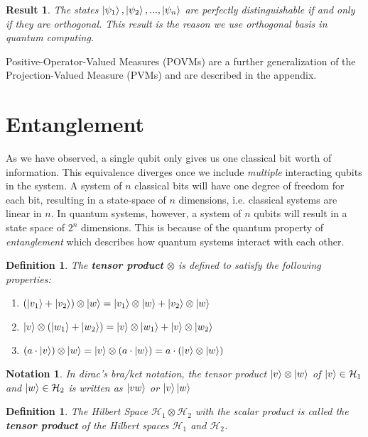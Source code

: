 \documentclass[12pt,twoside]{report}
\theoremstyle{thmstyle}
\newtheorem{defn}[subsection]{Definition}
\newtheorem{notation}[subsection]{Notation}
\newtheorem{result}[subsection]{Result}
\begin{document}
\begin{result}
            The states $\ket{\psi_1}, \ket{\psi_2}, ..., \ket{\psi_n}$ are perfectly distinguishable if and only if they are orthogonal. This result is the reason we use orthogonal basis in quantum computing.
\end{result}

Positive-Operator-Valued Measures (POVMs) are a further generalization of the Projection-Valued Measure (PVMs) and are described in the appendix. 

\section{Entanglement}
As we have observed, a single qubit only gives us one classical bit worth of information. This equivalence diverges once we include \textit{multiple} interacting qubits in the system. A system of $n$ classical bits will have one degree of freedom for each bit, resulting in a state-space of $n$ dimensions, i.e. classical systems are linear in $n$. In quantum systems, however, a system of $n$ qubits will result in a state space of $2^n$ dimensions. This is because of the quantum property of \textit{entanglement} which describes how quantum systems interact with each other.

\begin{defn}
    The \textbf{tensor product} $\otimes$ is defined to satisfy the following properties:
    \begin{enumerate}
        \item $(\ket{v_1} + \ket{v_2}) \otimes \ket{w} = \ket{v_1} \otimes \ket{w} + \ket{v_2} \otimes \ket{w}$
        \item $\ket{v} \otimes (\ket{w_1} + \ket{w_2}) = \ket{v} \otimes \ket{w_1} + \ket{v} \otimes \ket{w_2}$
        \item $(a \cdot \ket{v}) \otimes \ket{w} = \ket{v} \otimes (a \cdot \ket{w}) = a \cdot (\ket{v} \otimes \ket{w})$
    \end{enumerate}
\end{defn}

\begin{notation}
    In dirac's bra/ket notation, the tensor product $\ket{v} \otimes \ket{w}$ of $\ket{v} \in \mathcal{H}_1$ and $\ket{w} \in \mathcal{H}_2$ is written as $\ket{vw}$ or $\ket{v}\ket{w}$
\end{notation}


\begin{defn}
    The Hilbert Space $\mathcal{H}_1 \otimes \mathcal{H}_2$ with the scalar product is called the \textbf{tensor product} of the Hilbert spaces $\mathcal{H}_1$ and $\mathcal{H}_2$.
\end{defn}
\end{document}
